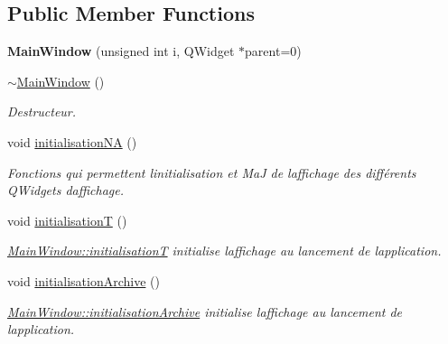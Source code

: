 \subsection*{Public Member Functions}
\begin{DoxyCompactItemize}
\item 
\mbox{\label{classMainWindow_a23f6a1e1df544f675935ad139936e99b}} 
{\bfseries Main\+Window} (unsigned int i, Q\+Widget $\ast$parent=0)
\item 
\mbox{\label{classMainWindow_ae98d00a93bc118200eeef9f9bba1dba7}} 
\hyperlink{classMainWindow_ae98d00a93bc118200eeef9f9bba1dba7}{$\sim$\+Main\+Window} ()
\begin{DoxyCompactList}\small\item\em Destructeur. \end{DoxyCompactList}\item 
void \hyperlink{classMainWindow_afd599be0a61a634d3a91a53dfb7679cf}{initialisation\+NA} ()
\begin{DoxyCompactList}\small\item\em Fonctions qui permettent l\textquotesingle{}initialisation et MaJ de l\textquotesingle{}affichage des différents Q\+Widgets d\textquotesingle{}affichage. \end{DoxyCompactList}\item 
\mbox{\label{classMainWindow_a091f96fb561d3663a491ff96d29c837a}} 
void \hyperlink{classMainWindow_a091f96fb561d3663a491ff96d29c837a}{initialisationT} ()
\begin{DoxyCompactList}\small\item\em \hyperlink{classMainWindow_a091f96fb561d3663a491ff96d29c837a}{Main\+Window\+::initialisationT} initialise l\textquotesingle{}affichage au lancement de l\textquotesingle{}application. \end{DoxyCompactList}\item 
\mbox{\label{classMainWindow_a6a25cc27e98750de7ce4e2d319aae9c4}} 
void \hyperlink{classMainWindow_a6a25cc27e98750de7ce4e2d319aae9c4}{initialisation\+Archive} ()
\begin{DoxyCompactList}\small\item\em \hyperlink{classMainWindow_a6a25cc27e98750de7ce4e2d319aae9c4}{Main\+Window\+::initialisation\+Archive} initialise l\textquotesingle{}affichage au lancement de l\textquotesingle{}application. \end{DoxyCompactList}\item 

\end{DoxyCompactItemize}
